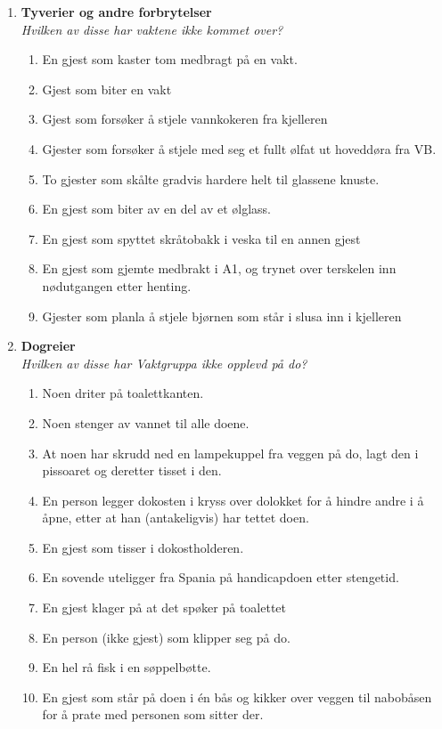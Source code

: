 \documentclass[11pt]{article}
\begin{document}
\begin{enumerate}
\newpage

\item \textbf{Tyverier og andre forbrytelser} \vspace{1mm} \\
\textit{Hvilken av disse har vaktene ikke kommet over?}
  \begin{enumerate}
\item En gjest som kaster tom medbragt på en vakt.
\item Gjest som biter en vakt
\item Gjest som forsøker å stjele vannkokeren fra kjelleren
\item Gjester som forsøker å stjele med seg et fullt ølfat ut hoveddøra fra VB.
\item To gjester som skålte gradvis hardere helt til glassene knuste.
\item En gjest som biter av en del av et ølglass.
\item En gjest som spyttet skråtobakk i veska til en annen gjest
\item En gjest som gjemte medbrakt i A1, og trynet over terskelen inn nødutgangen etter henting.
\item Gjester som planla å stjele bjørnen som står i slusa inn i kjelleren
  \end{enumerate}

  

\item \textbf{Dogreier} \vspace{1mm} \\
\textit{Hvilken av disse har Vaktgruppa ikke opplevd på do?}
    \begin{enumerate}
\item Noen driter på toalettkanten.
\item Noen stenger av vannet til alle doene.
\item At noen har skrudd ned en lampekuppel fra veggen på do, lagt den i pissoaret og deretter tisset i den.
\item En person legger dokosten i kryss over dolokket for å hindre andre i å åpne, etter at han (antakeligvis) har tettet doen.
\item En gjest som tisser i dokostholderen.
\item En sovende uteligger fra Spania på handicapdoen etter stengetid.
\item En gjest klager på at det spøker på toalettet
\item En person (ikke gjest) som klipper seg på do.
\item En hel rå fisk i en søppelbøtte.
\item En gjest som står på doen i én bås og kikker over veggen til nabobåsen for å prate med personen som sitter der.
    \end{enumerate}


\end{enumerate}
\end{document}
